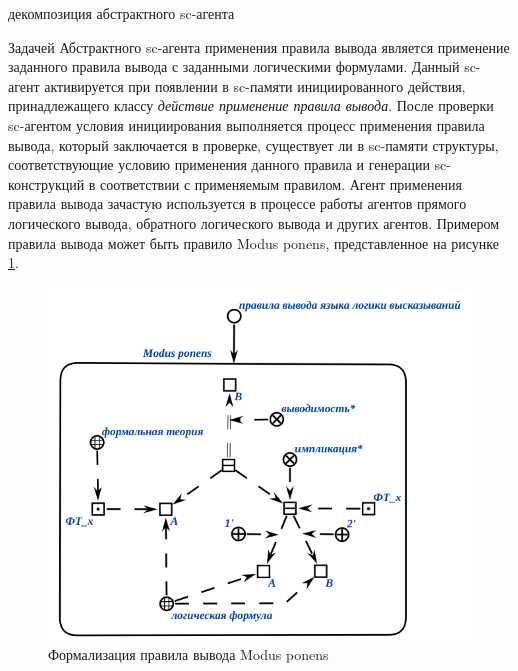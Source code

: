 \begin{SCn}
	\begin{scnrelfromset}{декомпозиция абстрактного sc-агента}
	\end{scnrelfromset}
\end{SCn}

Задачей Абстрактного sc-агента применения правила вывода является применение заданного правила вывода с заданными логическими формулами. Данный sc-агент активируется при появлении в sc-памяти инициированного действия, принадлежащего классу \textit{действие применение правила вывода}. После проверки sc-агентом условия инициирования выполняется процесс применения правила вывода, который заключается в  проверке, существует ли в sc-памяти структуры, соответствующие условию применения данного правила и генерации sc-конструкций в соответствии с применяемым правилом. Агент применения правила вывода зачастую используется в процессе работы агентов прямого логического вывода, обратного логического вывода и других агентов. Примером правила вывода может быть правило Modus ponens, представленное на рисунке \ref{fig:modus_ponens}.

\begin{figure}[http]
	\includegraphics[scale=0.8]{author/part3/figures/Modus_ponens.png}
	\caption{Формализация правила вывода Modus ponens}
	\label{fig:modus_ponens}
\end{figure}

